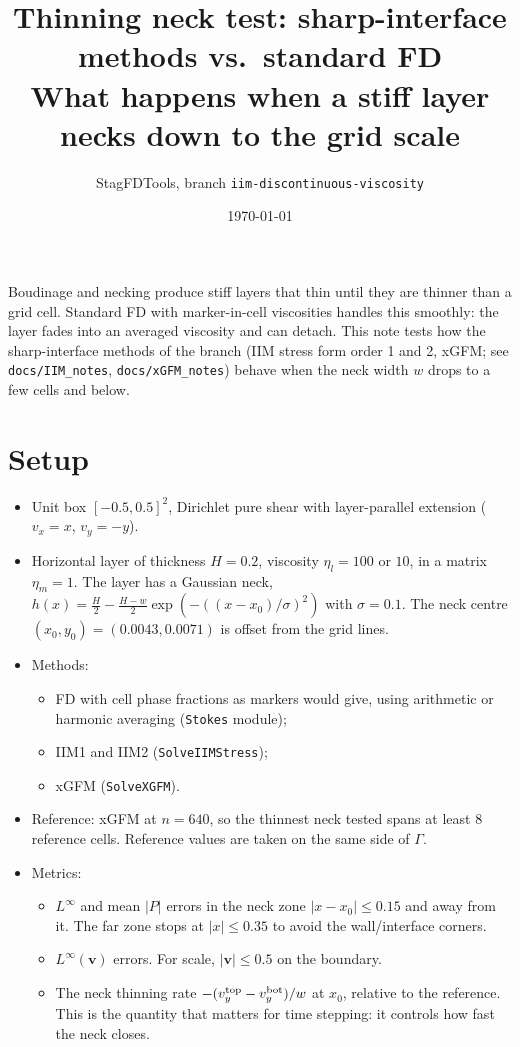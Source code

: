 \documentclass[11pt,a4paper]{article}
\title{Thinning neck test: sharp-interface methods vs.\ standard FD\\[2pt]
\large What happens when a stiff layer necks down to the grid scale}
\author{StagFDTools, branch \texttt{iim-discontinuous-viscosity}}
\date{\today}
\newcommand{\code}[1]{\texttt{#1}}
\begin{document}
\maketitle

\noindent Boudinage and necking produce stiff layers that thin until they are thinner than a grid
cell. Standard FD with marker-in-cell viscosities handles this smoothly: the layer fades into an
averaged viscosity and can detach. This note tests how the sharp-interface methods of the
branch (IIM stress form order 1 and 2, xGFM; see \code{docs/IIM\_notes},
\code{docs/xGFM\_notes}) behave when the neck width $w$ drops to a few cells and below.

\section{Setup}
\begin{itemize}
  \item Unit box $[-0.5,0.5]^2$, Dirichlet pure shear with layer-parallel extension
    ($v_x = x$, $v_y = -y$).
  \item Horizontal layer of thickness $H = 0.2$, viscosity $\eta_l = 100$ or $10$, in a matrix
    $\eta_m = 1$. The layer has a Gaussian neck,
    $h(x) = \tfrac{H}{2} - \tfrac{H-w}{2}\exp(-((x-x_0)/\sigma)^2)$ with $\sigma = 0.1$. The neck
    centre $(x_0,y_0) = (0.0043, 0.0071)$ is offset from the grid lines.
  \item Methods:
    \begin{itemize}
      \item FD with cell phase fractions as markers would give, using arithmetic or harmonic
        averaging (\code{Stokes} module);
      \item IIM1 and IIM2 (\code{SolveIIMStress});
      \item xGFM (\code{SolveXGFM}).
    \end{itemize}
  \item Reference: xGFM at $n = 640$, so the thinnest neck tested spans at least 8 reference
    cells. Reference values are taken on the same side of $\Gamma$.
  \item Metrics:
    \begin{itemize}
      \item $L^\infty$ and mean $|P|$ errors in the neck zone $|x-x_0| \le 0.15$ and away from it.
        The far zone stops at $|x| \le 0.35$ to avoid the wall/interface corners.
      \item $L^\infty(\mathbf{v})$ errors. For scale, $|\mathbf{v}| \le 0.5$ on the boundary.
      \item The neck thinning rate $-(v_y^{\rm top} - v_y^{\rm bot})/w$ at $x_0$, relative to the
        reference. This is the quantity that matters for time stepping: it controls how fast the
        neck closes.
    \end{itemize}
\end{itemize}
\end{document}
